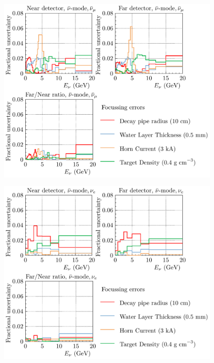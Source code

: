 \documentclass{article}
\begin{document}
\begin{figure}
  \includegraphics[width=\textwidth]{plots/fracerrs/nubarmode_numubar_Focussing}
  \caption{}
  \label{fig:foc_nubar_numubar}
\end{figure}

\begin{figure}
  \includegraphics[width=\textwidth]{plots/fracerrs/nubarmode_nue_Focussing}
  \caption{}
  \label{fig:foc_nubar_nue}
\end{figure}
\end{document}

